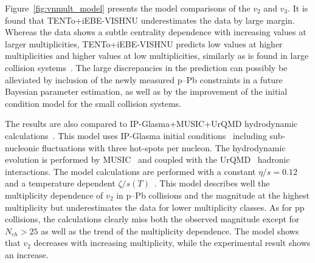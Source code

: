 Figure~\ref{fig:vnmult_model} presents the model comparisons of the $v_2$ and $v_3$. It is found that {TENTo}+iEBE-VISHNU underestimates the data by large margin. Whereas the data shows a subtle centrality dependence with increasing values at larger multiplicities, {TENTo}+iEBE-VISHNU predicts low values at higher multiplicities and higher values at low multiplicities, similarly as is found in large collision systems~\cite{Acharya:2020taj}. The large discrepancies in the prediction can possibly be alleviated by inclusion of the newly measured p--Pb constraints in a future Bayesian parameter estimation, as well as by the improvement of the initial condition model for the small collision systems.

The results are also compared to IP-Glasma+MUSIC+UrQMD hydrodynamic calculations~\cite{Schenke:2020mbo}. This model uses IP-Glasma initial conditions~\cite{Schenke:2012wb} including sub-nucleonic fluctuations with three hot-spots per nucleon. The hydrodynamic evolution is performed by MUSIC~\cite{Schenke:2010rr} and coupled with the UrQMD~\cite{Bass:1998ca,Bleicher:1999xi} hadronic interactions. 
The model calculations are performed with a constant $\eta/s=0.12$ and a temperature dependent $\zeta/s(T)$~\cite{Rose:2020lfc}. 
This model describes well the multiplicity dependence of $v_2$ in p--Pb collisions and the magnitude at the highest multiplicity but underestimates the data for lower multiplicity classes. As for pp collisions, the calculations clearly miss both the observed magnitude except for $N_{ch}>25$ as well as the trend of the multiplicity dependence. The model shows that $v_2$ decreases with increasing multiplicity, while the experimental result shows an increase.

